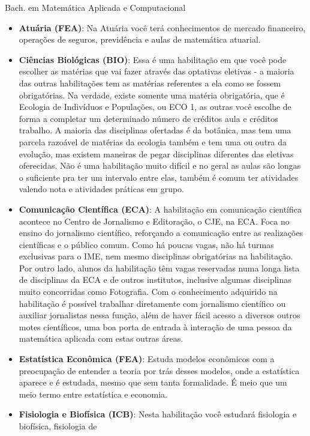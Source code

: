 \begin{subsecao}{Bach. em Matemática Aplicada e Computacional}
\begin{itemize}
 \item \textbf{Atuária (FEA)}:
    Na Atuária você terá conhecimentos de mercado financeiro, operações de seguros, previdência e aulas de matemática atuarial. 
  \item \textbf{Ciências Biológicas (BIO)}:
    Essa é uma habilitação em que você pode escolher as matérias que vai fazer
    através das optativas eletivas - a maioria das outras habilitações tem as
    matérias referentes a ela como se fossem obrigatórias. Na verdade, existe
    somente uma matéria obrigatória, que é Ecologia de Indivíduos e Populações,
    ou ECO 1, as outras você escolhe de forma a completar um determinado número
    de créditos aula e créditos trabalho. A maioria das disciplinas ofertadas
    é da botânica, mas tem uma parcela razoável de matérias da ecologia também
    e tem uma ou outra da evolução, mas existem maneiras de pegar disciplinas
    diferentes das eletivas oferecidas. Não é uma habilitação muito difícil e no
    geral as aulas são longas o suficiente pra ter um intervalo entre elas,
    também é comum ter atividades valendo nota e atividades práticas em grupo.
  \item \textbf{Comunicação Científica (ECA)}: A habilitação em
    comunicação científica acontece no Centro de Jornalismo e Editoração, o CJE,
    na ECA. Foca no ensino do jornalismo científico, reforçando a comunicação
    entre as realizações científicas e o público comum. Como há poucas vagas,
    não há turmas exclusivas para o IME, nem mesmo disciplinas obrigatórias na
    habilitação. Por outro lado, alunos da habilitação têm vagas reservadas numa
    longa lista de disciplinas da ECA e de outros institutos, inclusive algumas
    disciplinas muito concorridas como Fotografia. Com o conhecimento adquirido
    na habilitação é possível trabalhar diretamente com jornalismo científico ou
    auxiliar jornalistas nessa função, além de haver fácil acesso a diversos
    outros motes científicos, uma boa porta de entrada à interação de uma pessoa
    da matemática aplicada com estas outras áreas.
  \item \textbf{Estatística Econômica (FEA)}: Estuda modelos
    econômicos com a preocupação de entender a teoria por trás desses modelos,
    onde a estatística aparece e é estudada, mesmo que sem tanta formalidade. É
    meio que um meio termo entre estatística e economia.
  \item \textbf{Fisiologia e Biofísica (ICB)}:
    Nesta habilitação você estudará fisiologia e biofísica, fisiologia de

\end{itemize}
\end{subsecao}
